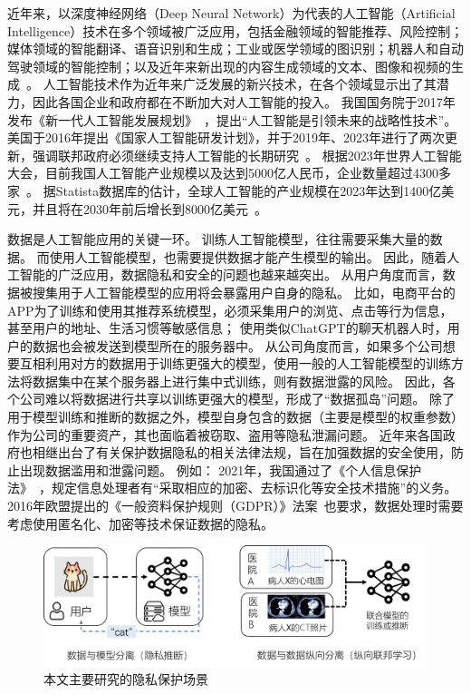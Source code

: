 近年来，以深度神经网络（Deep Neural Network）为代表的人工智能（Artificial Intelligence）技术在多个领域被广泛应用，包括金融领域的智能推荐、风险控制；媒体领域的智能翻译、语音识别和生成；工业或医学领域的图识别；机器人和自动驾驶领域的智能控制；以及近年来新出现的内容生成领域的文本、图像和视频的生成~\cite{lecun2015deep_learning,zhang2021ai_survey,wang2023chatgpt_survey}。
%
人工智能技术作为近年来广泛发展的新兴技术，在各个领域显示出了其潜力，因此各国企业和政府都在不断加大对人工智能的投入。
%
我国国务院于2017年发布《新一代人工智能发展规划》~\cite{china2017ai_plan}，提出“人工智能是引领未来的战略性技术”。
%
美国于2016年提出《国家人工智能研发计划》，并于2019年、2023年进行了两次更新，强调联邦政府必须继续支持人工智能的长期研究~\cite{usa2023ai_plan}。
%
根据2023年世界人工智能大会，目前我国人工智能产业规模以及达到5000亿人民币，企业数量超过4300多家~\cite{2023china_ai_conf}。
%
据Statista数据库的估计，全球人工智能的产业规模在2023年达到1400亿美元，并且将在2030年前后增长到8000亿美元~。

%
数据是人工智能应用的关键一环。
%
训练人工智能模型，往往需要采集大量的数据。
而使用人工智能模型，也需要提供数据才能产生模型的输出。
%
因此，随着人工智能的广泛应用，数据隐私和安全的问题也越来越突出。
%
从用户角度而言，数据被搜集用于人工智能模型的应用将会暴露用户自身的隐私。
%
比如，电商平台的APP为了训练和使用其推荐系统模型，必须采集用户的浏览、点击等行为信息，甚至用户的地址、生活习惯等敏感信息；
使用类似ChatGPT的聊天机器人时，用户的数据也会被发送到模型所在的服务器中。
%
从公司角度而言，如果多个公司想要互相利用对方的数据用于训练更强大的模型，使用一般的人工智能模型的训练方法将数据集中在某个服务器上进行集中式训练，则有数据泄露的风险。
因此，各个公司难以将数据进行共享以训练更强大的模型，形成了“数据孤岛”问题。
%
除了用于模型训练和推断的数据之外，模型自身包含的数据（主要是模型的权重参数）作为公司的重要资产，其也面临着被窃取、盗用等隐私泄漏问题。
%
近年来各国政府也相继出台了有关保护数据隐私的相关法律法规，旨在加强数据的安全使用，防止出现数据滥用和泄露问题。
%
例如：
2021年，我国通过了《个人信息保护法》~\cite{china_personal_information_protection}，规定信息处理者有“采取相应的加密、去标识化等安全技术措施”的义务。
2016年欧盟提出的《一般资料保护规则（GDPR）》法案~\cite{GDPR}也要求，数据处理时需要考虑使用匿名化、加密等技术保证数据的隐私。


\begin{figure}[h]
    \centering
    \includegraphics[width=1\linewidth]{Z_Resources/PPML-overview.png}
    \caption{本文主要研究的隐私保护场景}
    \label{fig:intro:ppml-overview}
\end{figure}


